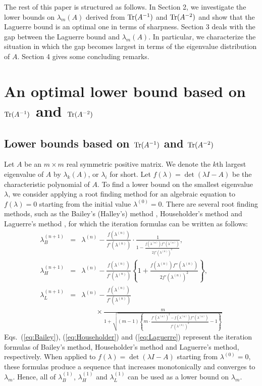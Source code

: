 \documentclass{amsart}
\begin{document}
The rest of this paper is structured as follows. In Section 2, we investigate the lower bounds on $\lambda_m(A)$ derived from ${\rm Tr}(A^{-1})$ and ${\rm Tr}(A^{-2})$ and show that the Laguerre bound is an optimal one in terms of sharpness. Section 3 deals with the gap between the Laguerre bound and $\lambda_m(A)$. In particular, we characterize the situation in which the gap becomes largest in terms of the eigenvalue distribution of $A$. Section 4 gives some concluding remarks.



\section{An optimal lower bound based on ${\rm Tr}(A^{-1})$ and ${\rm Tr}(A^{-2})$}
\subsection{Lower bounds based on ${\rm Tr}(A^{-1})$ and ${\rm Tr}(A^{-2})$}
Let $A$ be an $m\times m$ real symmetric positive matrix. We denote the $k$th largest eigenvalue of $A$ by $\lambda_k(A)$, or $\lambda_i$ for short. Let $f(\lambda)=\det(\lambda I-A)$ be the characteristic polynomial of $A$. To find a lower bound on the smallest eigenvalue $\lambda$, we consider applying a root finding method for an algebraic equation to $f(\lambda)=0$ starting from the initial value $\lambda^{(0)}=0$. There are several root finding methods, such as the Bailey's (Halley's) method \cite{Alefeld81}, Householder's method \cite{Householder70} and Laguerre's method \cite{Wilkinson88, Matt97}, for which the iteration formulas can be written as follows:
\begin{eqnarray}
\lambda_B^{(n+1)} &=& \lambda^{(n)}-\frac{f(\lambda^{(n)})}{f'(\lambda^{(n)})}\cdot\frac{1}{1-\frac{f(\lambda^{(n)})f''(\lambda^{(n)})}{2f'(\lambda^{(n)})^2}}
\label{eq:Bailey}, \\
\lambda_H^{({n+1})} &=& \lambda^{(n)}-\frac{f(\lambda^{(n)})}{f'(\lambda^{(n)})}\left\{1+\frac{f(\lambda^{(n)})f''(\lambda^{(n)})}{2f'(\lambda^{(n)})^2}\right\}
\label{eq:Householder}, \\
\lambda_L^{({n+1})} &=& \lambda^{(n)}-\frac{f(\lambda^{(n)})}{f'(\lambda^{(n)})} \nonumber \\
&& \quad \quad\times\frac{m}{1+\sqrt{(m-1)\left\{m\cdot\frac{f'(\lambda^{(n)})^2-f(\lambda^{(n)})f''(\lambda^{(n)})}{f'(\lambda^{(n)})^2}-1\right\}}}
\label{eq:Laguerre}
\end{eqnarray}
Eqs.~(\ref{eq:Bailey}), (\ref{eq:Householder}) and (\ref{eq:Laguerre}) represent the iteration formulas of Bailey's method, Householder's method and Laguerre's method, respectively. When applied to $f(\lambda)=\det(\lambda I-A)$ starting from $\lambda^{(0)}=0$, these formulas produce a sequence that increases monotonically and converges to $\lambda_m$. Hence, all of $\lambda_B^{(1)}$, $\lambda_H^{(1)}$ and $\lambda_L^{(1)}$ can be used as a lower bound on $\lambda_m$.
\end{document}
